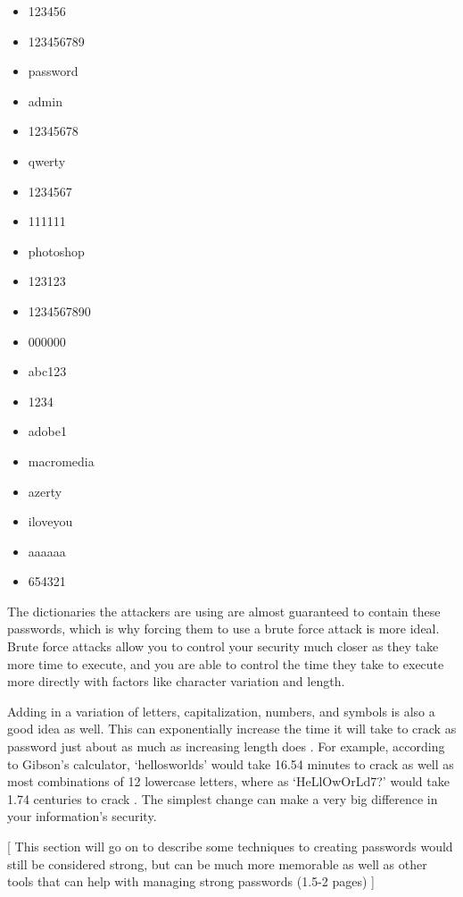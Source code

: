 \documentclass[acmsmall,nonacm]{acmart}
\begin{document}
\begin{center}
\begin{multicols}{2}
\begin{itemize}
    \item 123456
    \item 123456789
    \item password
    \item admin
    \item 12345678
    \item qwerty
    \item 1234567
    \item 111111
    \item photoshop
    \item 123123
    \item 1234567890
    \item 000000
    \item abc123
    \item 1234
    \item adobe1
    \item macromedia
    \item azerty
    \item iloveyou
    \item aaaaaa
    \item 654321
\end{itemize}
\end{multicols}
\end{center}


\noindent The dictionaries the attackers are using are almost guaranteed to contain these passwords, which is why forcing them to use a brute force attack is more ideal. Brute force attacks allow you to control your security much closer as they take more time to execute, and you are able to control the time they take to execute more directly with factors like character variation and length.
  

Adding in a variation of letters, capitalization, numbers, and symbols is also a good idea as well. This can exponentially increase the time it will take to crack as password just about as much as increasing length does \cite{lee_2014}. For example, according to Gibson’s calculator, ‘hellosworlds’ would take 16.54 minutes to crack as well as most combinations of 12 lowercase letters, where as ‘HeLlOwOrLd7?’ would take 1.74 centuries to crack \cite{rubenking_2021}. The simplest change can make a very big difference in your information's security.


\textcolor{beaver}{[ This section will go on to describe some techniques to creating passwords would still be considered strong, but can be much more memorable as well as other tools that can help with managing strong passwords (1.5-2 pages) ]}
\end{document}
